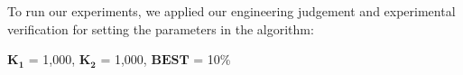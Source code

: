 To run our experiments, we applied our engineering judgement and experimental verification for setting the parameters in the algorithm:

\begin{center}
    $\bm{K_1}$ = 1,000, $\bm{K_2}$ = 1,000, $\bm{BEST}$ = 10\%
\end{center}
